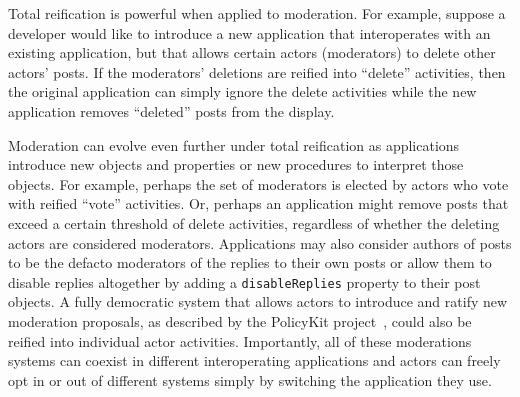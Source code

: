 
Total reification is powerful when applied to moderation.
For example, suppose a developer would like to introduce a new application
that interoperates with an existing application,
but that allows certain actors (moderators) to delete other actors' posts.
If the moderators' deletions are reified into ``delete'' activities,
then the original application can simply ignore the delete activities
while the new application removes ``deleted'' posts from the display.

Moderation can evolve even further under total reification
as applications introduce new objects and properties
or new procedures to interpret those objects.
For example,
perhaps the set of moderators is elected by actors who vote with reified ``vote'' activities.
Or, perhaps an application might remove posts that exceed a certain threshold of delete activities,
regardless of whether the deleting actors are considered moderators.
Applications may also consider authors of posts to be the defacto moderators of the replies to their
own posts or allow them to disable replies altogether by adding a \texttt{disableReplies}
property to their post objects.
A fully democratic system that allows actors to introduce and ratify new moderation proposals,
as described by the PolicyKit project~\cite{policykit}, could also be reified into
individual actor activities.
Importantly, all of these moderations systems can coexist in different interoperating
applications and actors can freely opt in or out of different systems simply by switching
the application they use.




